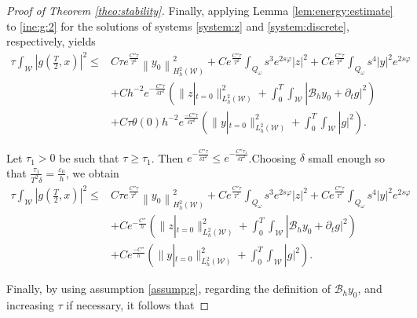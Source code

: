 \documentclass{amsart}
\numberwithin{equation}{section}
\begin{document}
\begin{proof}[Proof of Theorem \ref{theo:stability}]
Finally, applying Lemma \ref{lem:energy:estimate} to \eqref{ine:g:2} for the solutions of systems \eqref{system:z} and \eqref{system:discrete}, respectively, yields
\begin{equation}\label{ine:g:3}
\begin{aligned}
    \tau\int_{\mathcal{W}}\left|g\left( \frac{T}{2},x\right)\right|^{2}\leq &C\tau e^{\frac{C''\tau}{T^{2}}}\left\| y_{0}\right\|^{2}_{H^{2}_{h}(\mathcal{W})}+Ce^{\frac{C''\tau}{T^{2}}}\int_{Q_{\omega}}s^{3}e^{2s\varphi}|z|^{2}+Ce^{\frac{C''\tau}{T^{2}}}\int_{Q_{ \omega}}s^{4}|y|^{2}e^{2s\varphi}\\
&+Ch^{-2}e^{-\frac{C''\tau}{\delta T^{2}}}\left(\|z|_{t=0}\|_{L^2_h(\mathcal{W})}^2+\int_{0}^{T}\int_{\mathcal{W}}|\mathcal{B}_{h}y_{0}+\partial_{t}g|^{2}\right)\\
&+C\tau\theta(0)h^{-2}e^{\frac{-C''\tau}{\delta T^{2}}}\left(\|y|_{t=0}\|_{L^2_h(\mathcal{W})}^2+\int_{0}^{T}\int_{\mathcal{W}}|g|^{2}\right).
\end{aligned}
\end{equation}

Let $\tau_1>0$ be such that $\tau\geq \tau_1$. Then $e^{-\frac{C''\tau}{\delta T^{2}}}\leq e^{-\frac{C''\tau_1}{\delta T^{2}}}$.Choosing $\delta$ small enough so that $\frac{\tau_1}{T^{2}\delta}=\frac{\varepsilon_{0}}{h}$, we obtain
\begin{equation*}%
\begin{aligned}
    \tau\int_{\mathcal{W}}\left|g\left( \frac{T}{2},x\right)\right|^{2}\leq &C\tau e^{\frac{C''\tau}{T^{2}}}\left\| y_{0}\right\|^{2}_{H^{2}_{h}(\mathcal{W})}+Ce^{\frac{C''\tau}{T^{2}}}\int_{Q_{\omega}}s^{3}e^{2s\varphi}|z|^{2}+Ce^{\frac{C''\tau}{T^{2}}}\int_{Q_{ \omega}}s^{4}|y|^{2}e^{2s\varphi}\\
&+Ce^{-\frac{C''}{h}}\left(\|z|_{t=0}\|_{L^2_h(\mathcal{W})}^2+\int_{0}^{T}\int_{\mathcal{W}}|\mathcal{B}_{h}y_{0}+\partial_{t}g|^{2}\right)\\
&+Ce^{\frac{-C''}{h}}\left(\|y|_{t=0}\|_{L^2_h(\mathcal{W})}^2+\int_{0}^{T}\int_{\mathcal{W}}|g|^{2}\right).
\end{aligned}
\end{equation*}


Finally, by using assumption \eqref{assump:g}, regarding the definition of $\mathcal{B}_{h}y_{0}$, and increasing $\tau$ if necessary, it follows that


\end{proof}
\end{document}
